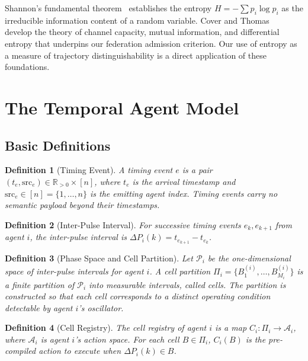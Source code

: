 \documentclass[twocolumn,10pt]{article}
\newtheorem{definition}{Definition}[section]
\newcommand{\DeltaP}{\Delta P}
\begin{document}
Shannon's fundamental theorem~\cite{Shannon1948} establishes the entropy
$H = -\sum p_i \log p_i$ as the irreducible information content of a random
variable. Cover and Thomas~\cite{Cover2006} develop the theory of channel
capacity, mutual information, and differential entropy that underpins our
federation admission criterion. Our use of entropy as a measure of trajectory
distinguishability is a direct application of these foundations.

\section{The Temporal Agent Model}
\label{sec:model}

\subsection{Basic Definitions}

\begin{definition}[Timing Event]
\label{def:timing_event}
A \emph{timing event} $e$ is a pair $(t_e, \mathrm{src}_e) \in \mathbb{R}_{>0}
\times [n]$, where $t_e$ is the arrival timestamp and $\mathrm{src}_e \in [n]
= \{1,\ldots,n\}$ is the emitting agent index. Timing events carry no semantic
payload beyond their timestamps.
\end{definition}

\begin{definition}[Inter-Pulse Interval]
\label{def:deltap}
For successive timing events $e_k, e_{k+1}$ from agent $i$, the
\emph{inter-pulse interval} is $\DeltaP_i(k) = t_{e_{k+1}} - t_{e_k}$.
\end{definition}

\begin{definition}[Phase Space and Cell Partition]
\label{def:cell}
Let $\mathcal{P}_i$ be the one-dimensional space of inter-pulse intervals for
agent $i$. A \emph{cell partition} $\Pi_i = \{B_1^{(i)}, \ldots, B_{M_i}^{(i)}\}$
is a finite partition of $\mathcal{P}_i$ into measurable intervals, called
\emph{cells}. The partition is constructed so that each cell corresponds to a
distinct operating condition detectable by agent $i$'s oscillator.
\end{definition}

\begin{definition}[Cell Registry]
\label{def:registry}
The \emph{cell registry} of agent $i$ is a map $C_i : \Pi_i \to \mathcal{A}_i$,
where $\mathcal{A}_i$ is agent $i$'s action space. For each cell $B \in \Pi_i$,
$C_i(B)$ is the pre-compiled action to execute when $\DeltaP_i(k) \in B$.
\end{definition}
\end{document}
